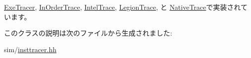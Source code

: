 \hyperlink{classTrace_1_1ExeTracer_a89ee504d255c652e5d54b73319d4d3dc}{ExeTracer}, \hyperlink{classTrace_1_1InOrderTrace_ae6b2b97097c71fb61fee749eace9166e}{InOrderTrace}, \hyperlink{classTrace_1_1IntelTrace_a244eaae9f6eb0042457439e5ad31c8f5}{IntelTrace}, \hyperlink{classTrace_1_1LegionTrace_a1c7bdae6744541417139f6c6353fd76f}{LegionTrace}, と \hyperlink{classTrace_1_1NativeTrace_ad520c1272aab137c3e207f526088843c}{NativeTrace}で実装されています。

このクラスの説明は次のファイルから生成されました:\begin{DoxyCompactItemize}
\item 
sim/\hyperlink{insttracer_8hh}{insttracer.hh}\end{DoxyCompactItemize}
